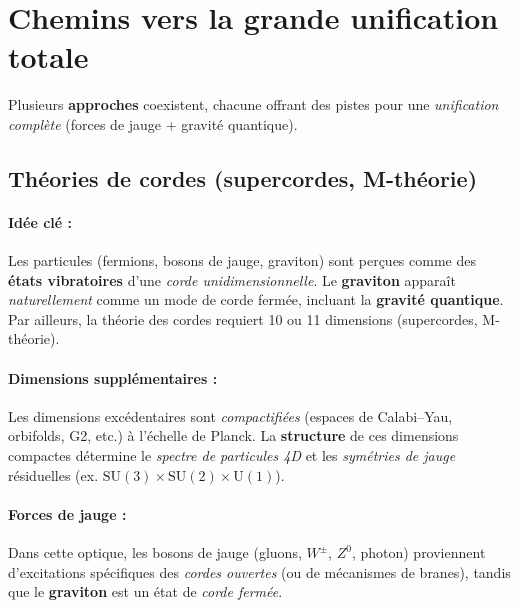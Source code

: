 \documentclass[12pt]{article}
\begin{document}
\begin{center}
\end{center}

\section{Chemins vers la grande unification totale}
\label{sec:approches}

Plusieurs \textbf{approches} coexistent, chacune offrant 
des pistes pour une \emph{unification complète} (forces de jauge + gravité quantique).

\subsection{Théories de cordes (supercordes, M-théorie)}
\label{sec:supercordes}

\paragraph{Idée clé :}
Les particules (fermions, bosons de jauge, graviton) sont perçues comme des \textbf{états vibratoires} 
d'une \emph{corde unidimensionnelle}.  
Le \textbf{graviton} apparaît \emph{naturellement} comme un mode de corde fermée, 
incluant la \textbf{gravité quantique}.  
Par ailleurs, la théorie des cordes requiert 10 ou 11 dimensions (supercordes, M-théorie).

\paragraph{Dimensions supplémentaires :}
Les dimensions \og excédentaires \fg{} sont \emph{compactifiées} 
(espaces de Calabi--Yau, orbifolds, G2, etc.) à l'échelle de Planck.  
La \textbf{structure} de ces dimensions compactes détermine le \emph{spectre de particules 4D} 
et les \emph{symétries de jauge} résiduelles (ex. $\mathrm{SU}(3)\times \mathrm{SU}(2)\times \mathrm{U}(1)$).

\paragraph{Forces de jauge :}
Dans cette optique, les bosons de jauge (gluons, $W^\pm$, $Z^0$, photon) 
proviennent d'excitations spécifiques des \emph{cordes ouvertes} (ou 
de mécanismes de branes), tandis que le \textbf{graviton} est un état de \emph{corde fermée}.
\end{document}
